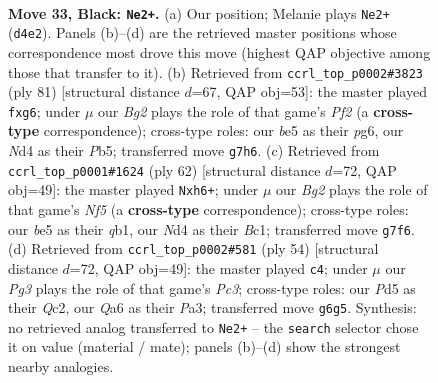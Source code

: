 \documentclass[11pt]{article}
\begin{document}
\clearpage

\begin{figure}[p]\centering
\begin{subfigure}{0.46\textwidth}\centering
\resizebox{\linewidth}{!}{%
\newchessgame
\chessboard[
  setfen={r5k1/1p3pb1/q5p1/p2pB3/3n3p/7P/P4PP1/RN1nQ1K1 b - - 3 33},
  showmover=false,
  pgfstyle=straightmove, color=movearrow, markmove={d4-e2}
]}
\caption{}
\end{subfigure}\hfill
\begin{subfigure}{0.46\textwidth}\centering
\resizebox{\linewidth}{!}{%
\newchessgame
\chessboard[
  setfen={3r2k1/3q1pp1/p5P1/1pR4p/3nQ3/P1B4P/1P3PK1/8 b - - 0 41},
  showmover=false,
  pgfstyle=straightmove, color=movearrow, markmove={f7-g6}
]}
\caption{}
\end{subfigure}
\\[4pt]
\begin{subfigure}{0.46\textwidth}\centering
\resizebox{\linewidth}{!}{%
\newchessgame
\chessboard[
  setfen={3r2k1/p4rb1/1p5p/2p1PN1R/5P2/2P3P1/P3QK2/1qB5 w - - 1 32},
  showmover=false,
  pgfstyle=straightmove, color=movearrow, markmove={f5-h6}
]}
\caption{}
\end{subfigure}\hfill
\begin{subfigure}{0.46\textwidth}\centering
\resizebox{\linewidth}{!}{%
\newchessgame
\chessboard[
  setfen={3r2k1/1p2npp1/3b3p/3qN3/p7/P1P5/2QB1PPP/4R1K1 w - - 0 28},
  showmover=false,
  pgfstyle=straightmove, color=movearrow, markmove={c3-c4}
]}
\caption{}
\end{subfigure}
\caption{\textbf{Move 33, Black: \texttt{Ne2+}.} (a) Our position; Melanie plays \texttt{Ne2+} (\texttt{d4e2}). Panels (b)--(d) are the retrieved master positions whose correspondence most drove this move (highest QAP objective among those that transfer to it). (b) Retrieved from \texttt{ccrl\_top\_p0002\#3823} (ply 81) [structural distance $d$=67, QAP obj=53]: the master played \texttt{fxg6}; under $\mu$ our \emph{Bg2} plays the role of that game's \emph{Pf2} (a \textbf{cross-type} correspondence); cross-type roles: our \emph{b}e5 as their \emph{p}g6, our \emph{N}d4 as their \emph{P}b5; transferred move \texttt{g7h6}. (c) Retrieved from \texttt{ccrl\_top\_p0001\#1624} (ply 62) [structural distance $d$=72, QAP obj=49]: the master played \texttt{Nxh6+}; under $\mu$ our \emph{Bg2} plays the role of that game's \emph{Nf5} (a \textbf{cross-type} correspondence); cross-type roles: our \emph{b}e5 as their \emph{q}b1, our \emph{N}d4 as their \emph{B}c1; transferred move \texttt{g7f6}. (d) Retrieved from \texttt{ccrl\_top\_p0002\#581} (ply 54) [structural distance $d$=72, QAP obj=49]: the master played \texttt{c4}; under $\mu$ our \emph{Pg3} plays the role of that game's \emph{Pc3}; cross-type roles: our \emph{P}d5 as their \emph{Q}c2, our \emph{Q}a6 as their \emph{P}a3; transferred move \texttt{g6g5}. Synthesis: no retrieved analog transferred to \texttt{Ne2+} -- the \texttt{search} selector chose it on value (material / mate); panels (b)--(d) show the strongest nearby analogies.}
\label{fig:thought-m65}
\end{figure}
\end{document}
